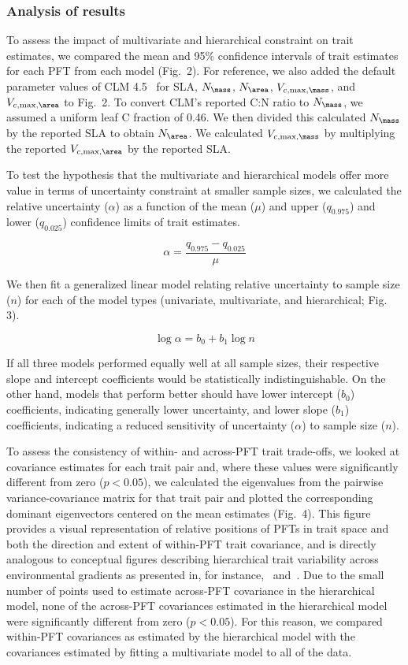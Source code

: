 \subsubsection{Analysis of results}

To assess the impact of multivariate and hierarchical constraint on trait estimates,
we compared the mean and 95\% confidence intervals of trait estimates for each PFT from each model (Fig.\ 2).
For reference, we also added the default parameter values of CLM 4.5~\cite[Table 8.1 in ]{clm45_note} for SLA, $N_{\mass}$, $N_{\area}$, $V_{c,\max,\mass}$, and $V_{c,\max,\area}$ to Fig.\ 2.
To convert CLM's reported C:N ratio to $N_{\mass}$, we assumed a uniform leaf C fraction of 0.46.
We then divided this calculated $N_{\mass}$ by the reported SLA to obtain $N_{\area}$.
We calculated $V_{c,\max,\mass}$ by multiplying the reported $V_{c,\max,\area}$ by the reported SLA\@.

To test the hypothesis that the multivariate and hierarchical models offer more value in terms of uncertainty constraint at smaller sample sizes, we calculated the relative uncertainty ($\alpha$) as a function of the mean ($\mu$) and upper ($q_{0.975}$) and lower ($q_{0.025}$) confidence limits of trait estimates.

\[ \alpha = \frac{q_{0.975} - q_{0.025}}{\mu} \]

We then fit a generalized linear model relating relative uncertainty to sample size ($n$) for each of the model types (univariate, multivariate, and hierarchical; Fig. 3).

\[ \log{\alpha} = b_0 + b_1 \log{n} \]

If all three models performed equally well at all sample sizes, their respective slope and intercept coefficients would be statistically indistinguishable.
On the other hand, models that perform better should have
lower intercept ($b_0$) coefficients, indicating generally lower uncertainty,
and
lower slope ($b_1$) coefficients, indicating a reduced sensitivity of uncertainty ($\alpha$) to sample size ($n$).

To assess the consistency of within- and across-PFT trait trade-offs, we looked at covariance estimates for each trait pair and, where these values were significantly different from zero ($p < 0.05$),
we calculated the eigenvalues from the pairwise variance-covariance matrix for that trait pair and plotted the corresponding dominant eigenvectors centered on the mean estimates (Fig.\ 4).
This figure provides a visual representation of relative positions of PFTs in trait space and both the direction and extent of within-PFT trait covariance, and is directly analogous to conceptual figures describing hierarchical trait variability across environmental gradients as presented in, for instance,~\cite{cornwell_community_2009} and~\cite{albert_intraspecific_2010}.
Due to the small number of points used to estimate across-PFT covariance in the hierarchical model, none of the across-PFT covariances estimated in the hierarchical model were significantly different from zero ($p < 0.05$).
For this reason, we compared within-PFT covariances as estimated by the hierarchical model with the covariances estimated by fitting a multivariate model to all of the data.

